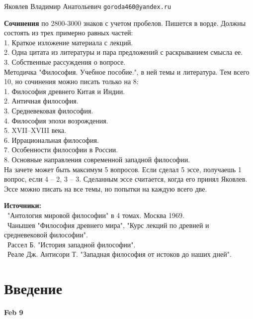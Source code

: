 \documentclass[a4paper, 12pt]{article}
\def\t{\hspace*{1cm}}
\def\bdot{\textbullet\ }
\begin{document}

{\noindent Яковлев Владимир Анатольевич \hfill \texttt{goroda460@yandex.ru}}
\vspace{.5cm}

\textbf{Сочинения} по 2800-3000 знаков с учетом пробелов. Пишется в ворде. Должны состоять из трех примерно равных частей:
\\\t 1. Краткое изложение материала с лекций.
\\\t 2. Одна цитата из литературы и пара предложений с раскрыванием смысла ее. 
\\\t 3. Собственные рассуждения о вопросе. 
\\Методичка "Философия. Учебное пособие.", в ней темы  и литература. Тем всего 10, но сочинения можно писать только на 8:
\\\t 1. Философия древнего Китая и Индии.
\\\t 2. Античная философия.
\\\t 3. Средневековая философия. 
\\\t 4. Философия эпохи возрождения. 
\\\t 5. XVII--XVIII века.
\\\t 6. Иррациональная философия. 
\\\t 7. Особенности философии в России. 
\\\t 8. Основные направления современной западной философии. 
\\ На зачете может быть максимум 5 вопросов. Если сделал 5 эссе, получаешь 1 вопрос, если 4 -- 2, 3 -- 3. Сделанным эссе считается, когда его принял Яковлев. Эссе можно писать на все темы, но попытки на каждую всего две. 

\textbf{Источники:}
\\\t \bdot "Антология мировой философии" в 4 томах. Москва 1969.
\\\t \bdot Чанышев "Философия древнего мира", "Курс лекций по древней и средневековой философии".
\\\t \bdot Рассел Б. "История западной философии".
\\\t \bdot Реале Дж. Антисори Т. "Западная философия от истоков до наших дней".

\clearpage

\tableofcontents


\clearpage

\section{Введение}
\hfill \textbf{Feb 9}
\end{document}
